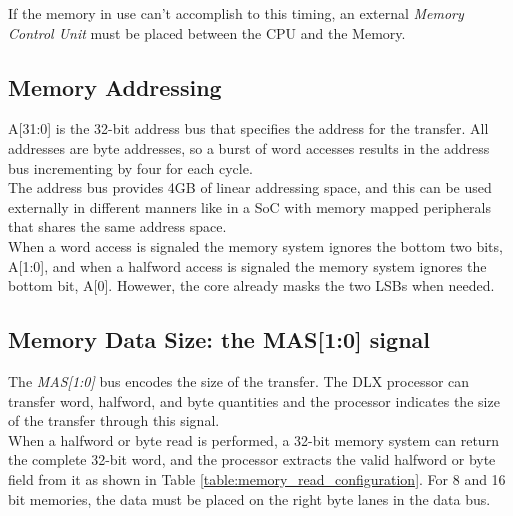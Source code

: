If the memory in use can't accomplish to this timing, an external \emph{Memory Control Unit} must be placed between the CPU and the Memory.

\subsection{Memory Addressing}
A[31:0] is the 32-bit address bus that specifies the address for the transfer. All addresses are byte addresses, so a burst of word accesses results in the address bus incrementing by four for each cycle.\\

The address bus provides 4GB of linear addressing space, and this can be used externally in different manners like in a SoC with memory mapped peripherals that shares the same address space.\\

When a word access is signaled the memory system ignores the bottom two bits, A[1:0], and when a halfword access is signaled the memory system ignores the bottom bit, A[0]. Howewer, the core already masks the two LSBs when needed.

\subsection{Memory Data Size: the MAS[1:0] signal}
\label{mas}

The \emph{MAS[1:0]} bus encodes the size of the transfer. The DLX processor can transfer word, halfword, and byte quantities and the processor indicates the size of the transfer through this signal.\\

When a halfword or byte read is performed, a 32-bit memory system can return the complete 32-bit word, and the processor extracts the valid halfword or byte field from it as shown in Table \ref{table:memory_read_configuration}. For 8 and 16 bit memories, the data must be placed on the right byte lanes in the data bus.



